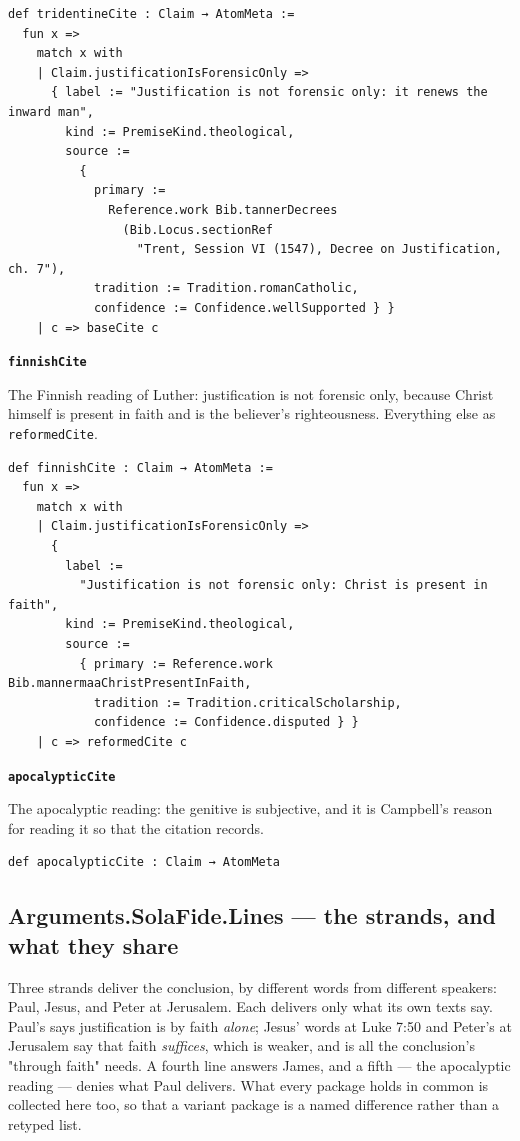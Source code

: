 \documentclass[11pt]{article}
\begin{document}
{\small\begin{verbatim}
def tridentineCite : Claim → AtomMeta :=
  fun x =>
    match x with
    | Claim.justificationIsForensicOnly =>
      { label := "Justification is not forensic only: it renews the inward man",
        kind := PremiseKind.theological,
        source :=
          {
            primary :=
              Reference.work Bib.tannerDecrees
                (Bib.Locus.sectionRef
                  "Trent, Session VI (1547), Decree on Justification, ch. 7"),
            tradition := Tradition.romanCatholic,
            confidence := Confidence.wellSupported } }
    | c => baseCite c
\end{verbatim}}
\par\medskip\noindent\textbf{\texttt{finnish\allowbreak{}Cite}}\par\nobreak\noindent
The Finnish reading of Luther: justification is not forensic only, because Christ himself is present in faith and is the believer's righteousness. Everything else as \texttt{reformed\allowbreak{}Cite}.

{\small\begin{verbatim}
def finnishCite : Claim → AtomMeta :=
  fun x =>
    match x with
    | Claim.justificationIsForensicOnly =>
      {
        label :=
          "Justification is not forensic only: Christ is present in faith",
        kind := PremiseKind.theological,
        source :=
          { primary := Reference.work Bib.mannermaaChristPresentInFaith,
            tradition := Tradition.criticalScholarship,
            confidence := Confidence.disputed } }
    | c => reformedCite c
\end{verbatim}}
\par\medskip\noindent\textbf{\texttt{apocalyptic\allowbreak{}Cite}}\par\nobreak\noindent
The apocalyptic reading: the genitive is subjective, and it is Campbell's reason for reading it so that the citation records.

{\small\begin{verbatim}
def apocalypticCite : Claim → AtomMeta
\end{verbatim}}
\subsection*{Arguments.SolaFide.Lines — the strands, and what they share}
Three strands deliver the conclusion, by different words from different speakers: Paul, Jesus, and Peter at Jerusalem. Each delivers only what its own texts say. Paul's says justification is by faith \emph{alone}; Jesus' words at Luke 7:50 and Peter's at Jerusalem say that faith \emph{suffices}, which is weaker, and is all the conclusion's "through faith" needs. A fourth line answers James, and a fifth — the apocalyptic reading — denies what Paul delivers. What every package holds in common is collected here too, so that a variant package is a named difference rather than a retyped list.
\end{document}
